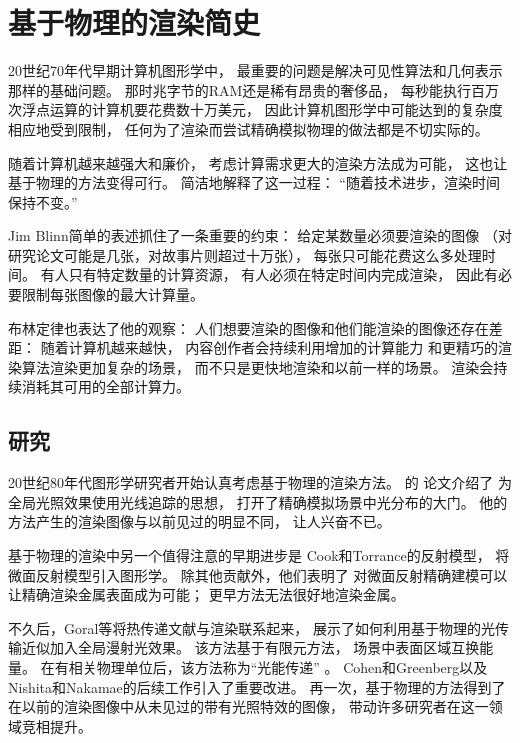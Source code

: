 \section{基于物理的渲染简史}\label{sec:基于物理的渲染简史}

20世纪70年代早期计算机图形学中，
最重要的问题是解决可见性算法和几何表示那样的基础问题。
那时兆字节的RAM还是稀有昂贵的奢侈品，
每秒能执行百万次浮点运算的计算机要花费数十万美元，
因此计算机图形学中可能达到的复杂度相应地受到限制，
任何为了渲染而尝试精确模拟物理的做法都是不切实际的。

随着计算机越来越强大和廉价，
考虑计算需求更大的渲染方法成为可能，
这也让基于物理的方法变得可行。
简洁地解释了这一过程：
“随着技术进步，渲染时间保持不变。”

Jim Blinn简单的表述抓住了一条重要的约束：
给定某数量必须要渲染的图像
（对研究论文可能是几张，对故事片则超过十万张），
每张只可能花费这么多处理时间。
有人只有特定数量的计算资源，
有人必须在特定时间内完成渲染，
因此有必要限制每张图像的最大计算量。

布林定律也表达了他的观察：
人们想要渲染的图像和他们能渲染的图像还存在差距：
随着计算机越来越快，
内容创作者会持续利用增加的计算能力
和更精巧的渲染算法渲染更加复杂的场景，
而不只是更快地渲染和以前一样的场景。
渲染会持续消耗其可用的全部计算力。

\subsection{研究}\label{sub:研究}
20世纪80年代图形学研究者开始认真考虑基于物理的渲染方法。
\citeauthor{10.1145/358876.358882}的
论文\parencite*{10.1145/358876.358882}介绍了
为全局光照效果使用光线追踪的思想，
打开了精确模拟场景中光分布的大门。
他的方法产生的渲染图像与以前见过的明显不同，
让人兴奋不已。

基于物理的渲染中另一个值得注意的早期进步是
Cook和Torrance的反射模型\parencite*{10.1145/800224.806819,10.1145/357290.357293}，
将微面反射模型引入图形学。
除其他贡献外，他们表明了
对微面反射精确建模可以让精确渲染金属表面成为可能；
更早方法无法很好地渲染金属。

不久后，Goral等\parencite*{10.1145/800031.808601}将热传递文献与渲染联系起来，
展示了如何利用基于物理的光传输近似加入全局漫射光效果。
该方法基于有限元方法，
场景中表面区域互换能量。
在有相关物理单位后，该方法称为“光能传递”
。
Cohen和Greenberg\parencite*{10.1145/325334.325171}以及
Nishita和Nakamae\parencite*{10.1145/325334.325169}的后续工作引入了重要改进。
再一次，基于物理的方法得到了在以前的渲染图像中从未见过的带有光照特效的图像，
带动许多研究者在这一领域竞相提升。

